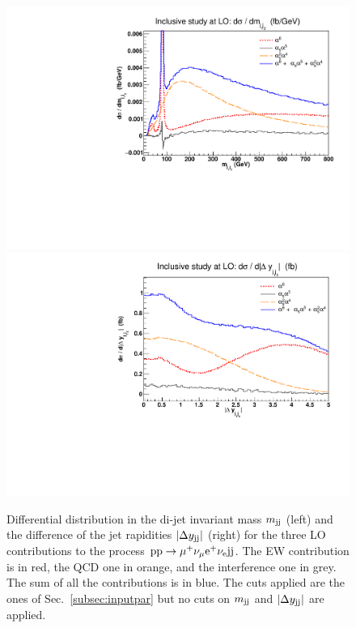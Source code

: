 \begin{figure}[hbt]
\centering
\includegraphics[scale=0.395]{figures/scanfigures/mjj_full.pdf}
\includegraphics[scale=0.395]{figures/scanfigures/dyjj_full.pdf}
\caption{Differential distribution in the di-jet invariant mass $m_{\text{j}\text{j}}$ (left) and the difference of the jet rapidities $|\Delta y_{\text{j}\text{j}}|$ (right) for the three LO contributions to the process ${\rm p}{\rm p}\to\mu^+\nu_\mu{\rm e}^+\nu_{\rm e}{\rm j}{\rm j}$.
The EW contribution is in red, the QCD one in orange, and the interference one in grey.
The sum of all the contributions is in blue.
The cuts applied are the ones of Sec.~\ref{subsec:inputpar} but no cuts on $m_{\text{j}\text{j}}$ and $|\Delta y_{\text{j}\text{j}}|$ are applied.}
\label{fig:mjjdyjj_1d}
\end{figure}

